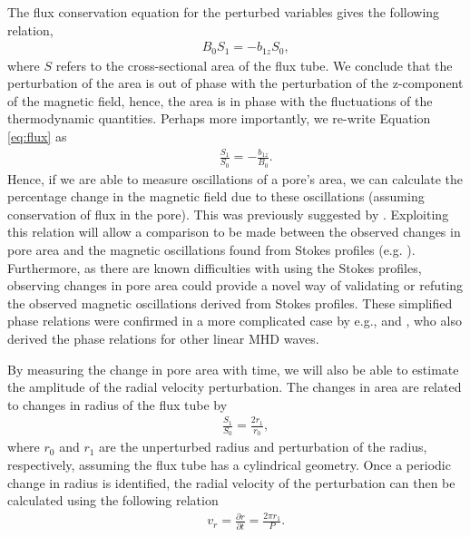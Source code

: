     The flux conservation equation for the perturbed variables gives the following relation,
    \begin{align}
        &&B_0S_1=-b_{1z}S_0,
        \label{eq:flux}
    \end{align}
    where $S$ refers to the cross-sectional area of the flux tube.
    We conclude that the perturbation of the area is out of phase with the perturbation of the  z-component of the magnetic field, hence, the area is in phase with the fluctuations of the thermodynamic quantities.
    Perhaps more importantly, we re-write Equation \ref{eq:flux} as
    \begin{align}
        &&\frac{S_1}{S_0}=-\frac{b_{1z}}{B_0}.
        \label{eq:mag_area}
    \end{align}
    Hence, if we are able to measure oscillations of a pore's area, we can calculate the percentage change in the magnetic field due to these oscillations (assuming conservation of flux in the pore).
    This was previously suggested by \cite{0004-637X-806-1-132}.
    Exploiting this relation will allow a comparison to be made between the observed changes in pore area and the magnetic oscillations found from Stokes profiles (e.g. \citealp{Balthasar2000}).
    Furthermore, as there are known difficulties with using the Stokes profiles, observing changes in pore area could provide a novel way of validating or refuting the observed magnetic oscillations derived from Stokes profiles.
    These simplified phase relations were confirmed in a more complicated case by e.g., \cite{Moreels2013} and \cite{Moreels2013b}, who also derived the phase relations for other linear MHD waves. 
    
    By measuring the change in pore area with time, we will also be able to estimate the amplitude of the radial velocity perturbation.
    The changes in area are related to changes in radius of the flux tube by
    \begin{align}
        &&\frac{S_1}{S_0}=\frac{2r_1}{r_0},
        \label{eq:area_rad}
    \end{align}
    where $r_0$ and $r_1$ are the unperturbed radius and perturbation of the radius, respectively, assuming the flux tube has a cylindrical geometry.
    Once a periodic change in radius is identified, the radial velocity of the perturbation can then be calculated using the following relation
    \begin{align}
        &&v_r=\frac{\partial r}{\partial t}=\frac{2\pi r_1}{P}.
        \label{eq:rad_vel}
    \end{align}
  
